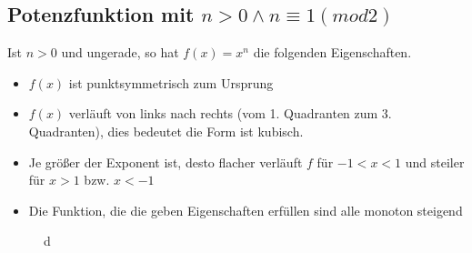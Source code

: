 \subsection{Potenzfunktion mit $n>0\land n\equiv1(mod2)$}
Ist $n>0$ und ungerade, so hat $f(x)=x^n$ die folgenden Eigenschaften.
\begin{itemize}
	\item $f(x)$ ist punktsymmetrisch zum Ursprung
	\item $f(x)$ verläuft von links nach rechts (vom 1. Quadranten zum 3. Quadranten), dies bedeutet die Form ist kubisch. %
	\item Je größer der Exponent ist, desto flacher verläuft $f$ für $-1<x<1$ und steiler für $x>1$ bzw. $x<-1$
	\item Die Funktion, die die geben Eigenschaften erfüllen sind alle monoton steigend
\end{itemize}
\begin{figure}[h!]
\centering
{}
\caption{d}
\label{g}
\end{figure}
